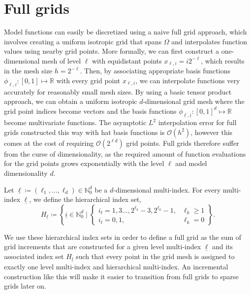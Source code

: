 \documentclass[
  a4paper,  %
  twoside,  %
  bibliography=totoc,
  headsepline,
  cleardoublepage=empty,
  parskip=half,
  draft=false
]{scrbook}
\begin{document}
\section{Full grids}

Model functions can easily be discretized using a naive full grid approach, which involves creating a uniform isotropic grid that spans $\Omega$ and interpolates function values using nearby grid points.
More formally, we can first construct a one-dimensional mesh of level $\ell$ with equidistant points $x_{\ell,i}=i2^{-\ell}$, which results in the mesh size $h=2^{-\ell}$.
Then, by associating appropriate basis functions $\phi_{\ell,i} \colon [0,1] \mapsto \mathds{R}$ with every grid point $x_{\ell,i}$, we can interpolate functions very accurately for reasonably small mesh sizes.
By using a basic tensor product approach, we can obtain a uniform isotropic $d$-dimensional grid mesh where the grid point indices become vectors and the basis functions $\phi_{\underline{\ell},\underline{i}} \colon [0,1]^d \mapsto \mathds{R}$ become multivariate functions.
The asymptotic $L^2$ interpolation error for full grids constructed this way with hat basis functions is $\mathcal{O}(h^2)$, however this comes at the cost of requiring $\mathcal{O}(2^{\ell d})$ grid points.
Full grids therefore suffer from the curse of dimensionality, as the required amount of function evaluations for the grid points grows exponentially with the level $\ell$ and model dimensionality $d$.

\begin{definition}
Let $\underline{\ell} \coloneqq (\ell_1, \dots, \ell_d) \in \mathds{N}_0^d$ be a $d$-dimensional multi-index.
For every multi-index $\underline{\ell}$, we define the hierarchical index set,
\begin{equation}
H_{\underline{\ell}} \coloneqq \left\{ \underline{i} \in \mathds{N}^d_0 \mid
\begin{cases}
    i_t=1,3\dots,2^{\ell_k} - 3, 2^{\ell_k} - 1, & \ell_k \geq 1 \\
    i_t=0,1, & \ell_k = 0
\end{cases} \right\}.
\end{equation}
\end{definition}
%
We use these hierarchical index sets in order to define a full grid as the sum of grid increments that are constructed for a given level multi-index $\underline{\ell}$ and its associated index set $H_{\underline{l}}$ such that every point in the grid mesh is assigned to exactly one level multi-index and hierarchical multi-index.
An incremental construction like this will make it easier to transition from full grids to sparse grids later on.
\end{document}
